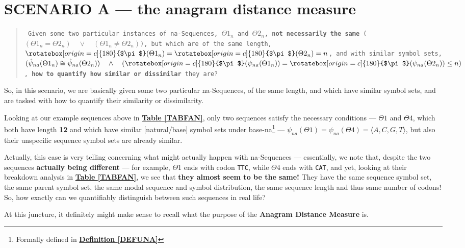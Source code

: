 \documentclass[a4paper, 18pt]{book} %
\newcommand{\invpi}{\rotatebox[origin=c]{180}{$\pi$}}
\begin{document}
\section{SCENARIO A --- the anagram distance measure}
\label{SECSCENA}


\begin{quote}
\small
\texttt{
Given some two particular instances of na-Sequences, $\Theta1_n$ and $\Theta2_n$, \textbf{not necessarily the same} ($(\Theta1_n = \Theta2_n) \quad \lor \quad (\Theta1_n \neq \Theta2_n)$), but which are of the same length, $\invpi(\Theta1_n) = \invpi(\Theta2_n) = n$, and with similar symbol sets, $(\hat{\psi}_{na}(\Theta1_n) \cong \hat{\psi}_{na}(\Theta2_n)) \quad \land \quad (\invpi(\psi_{na}(\Theta1_n)) = \invpi(\psi_{na}(\Theta2_n)) \leq n)$, \textbf{how to quantify how similar or dissimilar} they are?}
\end{quote}

So, in this scenario, we are basically given some two particular na-Sequences, of the same length, and which have similar symbol sets, and are tasked with how to quantify their similarity or dissimilarity.

Looking at our example sequences above in \textbf{\hyperref[TABFAN]{Table \ref{TABFAN}}}, only two sequences satisfy the necessary conditions --- $\Theta1$ and $\Theta4$, which both have length \textbf{12} and which have similar [natural/base]  symbol sets under base-na\footnote{Formally defined in \textbf{\hyperref[DEFUNA]{Definition \ref{DEFUNA}}}} --- $\psi_{na}(\Theta1) = \psi_{na}(\Theta4) = \langle A, C, G, T \rangle$, but also their unspecific sequence symbol sets are already similar.

Actually, this case is very telling concerning what might actually happen with na-Sequences --- essentially, we note that, despite the two sequences \textbf{actually being different} --- for example, $\Theta1$ ends with codon \texttt{TTC}, while $\Theta4$ ends with \texttt{CAT}, and yet, looking at their breakdown analysis in \textbf{\hyperref[TABFAN]{Table \ref{TABFAN}}}, we see that \textbf{they almost seem to be the same!} They have the same sequence symbol set, the same parent symbol set, the same modal sequence and symbol distribution, the same sequence length and thus same number of codons! So, how exactly can we quantifiably distinguish between such sequences in real life?

At this juncture, it definitely might make sense to recall what the purpose of the \textbf{Anagram Distance Measure}\cite{adtpaper} is.
\end{document}
